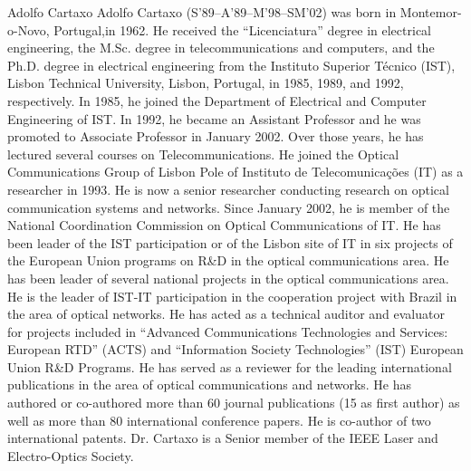 \documentclass[journal]{IEEEtran}
\begin{document}
\begin{IEEEbiographynophoto}{Adolfo Cartaxo}
Adolfo Cartaxo  (S’89–A’89–M’98–SM’02) was born in Montemor-o-Novo, Portugal,in 1962. He received the “Licenciatura” degree in electrical engineering, the M.Sc. degree in telecommunications and computers, and the Ph.D. degree in electrical engineering from the Instituto Superior Técnico (IST), Lisbon Technical University, Lisbon, Portugal, in 1985, 1989, and 1992, respectively. In 1985, he joined the Department of Electrical and Computer Engineering of IST. In 1992, he became an Assistant Professor and he was promoted to Associate Professor in January 2002. Over those years, he has lectured several courses on Telecommunications. He joined the Optical Communications Group of Lisbon Pole of Instituto de Telecomunicações (IT) as a researcher in 1993. He is now a senior researcher conducting research on optical communication systems and networks. Since January 2002, he is member of the National Coordination Commission on Optical Communications of IT. He has been leader of the IST participation or of the Lisbon site of IT in six projects of the European Union programs on R&D in the optical communications area. He has been leader of several national projects in the optical communications area. He is the leader of IST-IT participation in the cooperation project with Brazil in the area of optical networks. He has acted as a technical auditor and evaluator for projects included in “Advanced Communications Technologies and Services: European RTD” (ACTS) and “Information Society Technologies” (IST) European Union R&D Programs. He has served as a reviewer for the leading international publications in the area of optical communications and networks. He has authored or co-authored more than 60 journal publications (15 as first author) as well as more than 80 international conference papers. He is co-author of two international patents.
Dr. Cartaxo is a Senior member of the IEEE Laser and Electro-Optics Society. 

\end{IEEEbiographynophoto}
\end{document}
